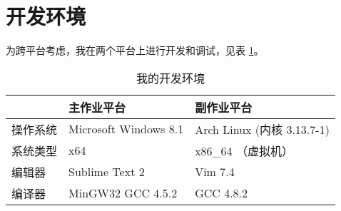 \section{开发环境}

为跨平台考虑，我在两个平台上进行开发和调试，见表 \ref{development}。

\begin{table}[htbp]
\begin{center}
\begin{tabular}{l|ll}
 & 主作业平台 & 副作业平台 \\\hline
操作系统 & Microsoft Windows 8.1 & Arch Linux (内核 3.13.7-1) \\
系统类型 & x64 & x86\_64 （虚拟机）\\
编辑器 & Sublime Text 2 & Vim 7.4 \\
编译器 & MinGW32 GCC 4.5.2 & GCC 4.8.2 \\
\end{tabular}
\end{center}
\caption{\label{development}我的开发环境}
\end{table}
